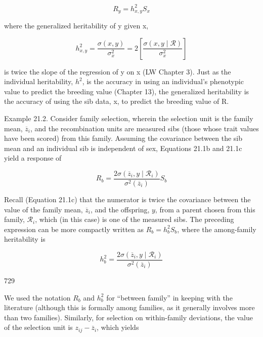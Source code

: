 \documentclass{article}
\begin{document}
\begin{equation}
R_{y}=h_{x,y}^{2}S_{x}
\tag{21.2a}
\label{eq:21_2a}
\end{equation}

where the generalized heritability of y given x,

\begin{equation}
h_{x,y}^{2}=\frac{\sigma(x,y)}{\sigma_{x}^{2}}=2\left[\frac{\sigma(x,y\mid\mathcal{R})}{\sigma_{x}^{2}}\right]
\tag{21.2b}
\label{eq:21_2b}
\end{equation}

is twice the slope of the regression of y on x (LW Chapter 3). Just as the individual heritability,  $ h^{2} $, is the accuracy in using an individual's phenotypic value to predict the breeding value (Chapter 13), the generalized heritability is the accuracy of using the sib data, x, to predict the breeding value of R.

Example 21.2. Consider family selection, wherein the selection unit is the family mean,  $ \overline{z}_{i} $, and the recombination units are measured sibs (those whose trait values have been scored) from this family. Assuming the covariance between the sib mean and an individual sib is independent of sex, Equations 21.1b and 21.1c yield a response of

\begin{equation}
R_{b}=\frac{2\sigma\left(\overline{z}_{i},y\mid\mathcal{R}_{i}\right)}{\sigma^{2}\left(\overline{z}_{i}\right)}S_{b}
\end{equation}

Recall (Equation 21.1c) that the numerator is twice the covariance between the value of the family mean,  $ \overline{z}_i $, and the offspring,  $ y $, from a parent chosen from this family,  $ \mathcal{R}_i $, which (in this case) is one of the measured sibs. The preceding expression can be more compactly written as  $ R_b = h_b^2 S_b $, where the among-family heritability is

\begin{equation}
h_{b}^{2}=\frac{2\sigma\left(\overline{z}_{i},y\mid\mathcal{R}_{i}\right)}{\sigma^{2}\left(\overline{z}_{i}\right)}
\end{equation}

729

We used the notation  $ R_b $ and  $ h_b^2 $ for “between family” in keeping with the literature (although this is formally among families, as it generally involves more than two families). Similarly, for selection on within-family deviations, the value of the selection unit is  $ z_{ij} - \overline{z}_i $, which yields
\end{document}
